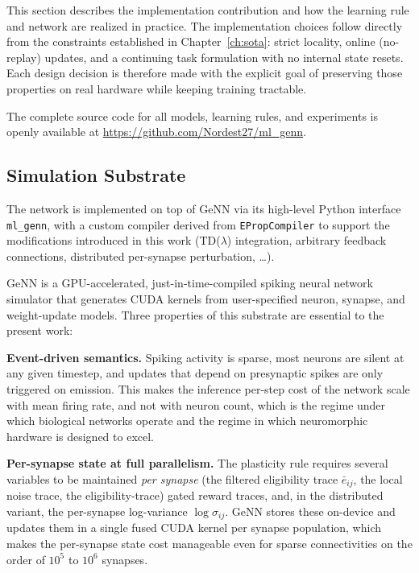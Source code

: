 This section describes the implementation contribution and how the learning rule and network are
realized in practice. The implementation choices follow directly
from the constraints established in Chapter~\ref{ch:sota}:
strict locality, online (no-replay) updates, and a continuing
task formulation with no internal state resets. Each design
decision is therefore made with the explicit goal of preserving
those properties on real hardware while keeping training
tractable.

The complete source code for all models, learning rules, and experiments is
openly available at \url{https://github.com/Nordest27/ml_genn}.
\subsection{Simulation Substrate}
\label{subsec:framework}

The network is implemented on top of GeNN \citep{Yavuz2016GeNN} via its high-level Python interface
\texttt{ml\_genn}, with a custom compiler derived from
\texttt{EPropCompiler} to support the modifications introduced
in this work (TD($\lambda$) integration, arbitrary feedback connections, distributed per-synapse
perturbation, \ldots).

GeNN is a GPU-accelerated, just-in-time-compiled spiking neural
network simulator that generates CUDA kernels from
user-specified neuron, synapse, and weight-update models. Three
properties of this substrate are essential to the present work:

\textbf{Event-driven semantics.}
Spiking activity is sparse, most neurons are silent at any
given timestep, and updates that depend on presynaptic
spikes are only triggered
on emission. This makes the inference per-step cost of the network
scale with mean firing rate, and not with neuron count,
which is the regime under which biological networks
operate and the regime in which neuromorphic hardware is
designed to excel.

\textbf{Per-synapse state at full parallelism.}
The plasticity rule requires several variables to be
maintained \emph{per synapse} (the filtered eligibility
trace $\bar e_{ij}$, the local noise trace, the
eligibility-trace) gated reward traces, and, in the distributed
variant, the per-synapse log-variance $\log\sigma_{ij}$.
GeNN stores these on-device and updates them in a single
fused CUDA kernel per synapse population, which makes the
per-synapse state cost manageable even for sparse
connectivities on the order of $10^{5}$ to $10^{6}$ synapses.

